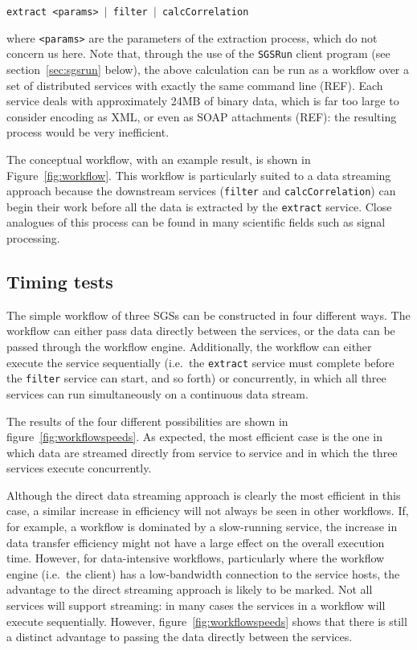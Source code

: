 \documentclass[a4paper]{article}
\begin{document}
\texttt{extract <params> $|$ filter $|$ calcCorrelation}

\noindent where \texttt{<params>} are the parameters of the extraction process, which do not concern us here.  Note that, through the use of the \texttt{SGSRun} client program (see section~\ref{sec:sgsrun} below), the above calculation can be run as a workflow over a set of distributed services with exactly the same command line (REF).  Each service deals with approximately 24MB of binary data, which is far too large to consider encoding as XML, or even as SOAP attachments (REF): the resulting process would be very inefficient.

The conceptual workflow, with an example result, is shown in Figure~\ref{fig:workflow}.  This workflow is particularly suited to a data streaming approach because the downstream services (\texttt{filter} and \texttt{calcCorrelation}) can begin their work before all the data is extracted by the \texttt{extract} service.  Close analogues of this process can be found in many scientific fields such as signal processing.

\subsection{Timing tests}
The simple workflow of three SGSs can be constructed in four different ways.  The workflow can either pass data directly between the services, or the data can be passed through the workflow engine.  Additionally, the workflow can either execute the service sequentially (i.e.\ the \texttt{extract} service must complete before the \texttt{filter} service can start, and so forth) or concurrently, in which all three services can run simultaneously on a continuous data stream.

The results of the four different possibilities are shown in figure~\ref{fig:workflowspeeds}.  As expected, the most efficient case is the one in which data are streamed directly from service to service and in which the three services execute concurrently.

Although the direct data streaming approach is clearly the most efficient in this case, a similar increase in efficiency will not always be seen in other workflows.  If, for example, a workflow is dominated by a slow-running service, the increase in data transfer efficiency might not have a large effect on the overall execution time.  However, for data-intensive workflows, particularly where the workflow engine (i.e.\ the client) has a low-bandwidth connection to the service hosts, the advantage to the direct streaming approach is likely to be marked.  Not all services will support streaming: in many cases the services in a workflow will execute sequentially.  However, figure~\ref{fig:workflowspeeds} shows that there is still a distinct advantage to passing the data directly between the services.
\end{document}
